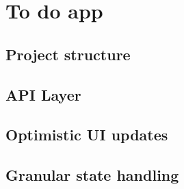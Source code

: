 \section{To do app}

\subsection{Project structure}
\subsection{API Layer}
\subsection{Optimistic UI updates}
\subsection{Granular state handling}
